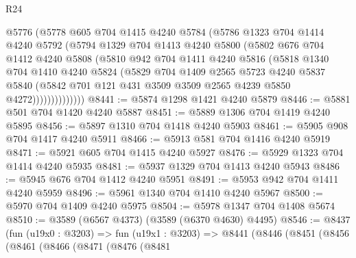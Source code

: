 \begin{lexlean}{R24}
\begin{coremodule}
                @5776
                (@5778
                  @605
                  @704
                  @1415
                  @4240
                  @5784
                  (@5786
                    @1323
                    @704
                    @1414
                    @4240
                    @5792
                    (@5794
                      @1329
                      @704
                      @1413
                      @4240
                      @5800
                      (@5802
                        @676
                        @704
                        @1412
                        @4240
                        @5808
                        (@5810
                          @942
                          @704
                          @1411
                          @4240
                          @5816
                          (@5818
                            @1340
                            @704
                            @1410
                            @4240
                            @5824
                            (@5829
                              @704
                              @1409
                              @2565
                              @5723
                              @4240
                              @5837
                              @5840
                              (@5842
                                @701
                                @121
                                @431
                                @3509
                                @3509
                                @2565
                                @4239
                                @5850
                                @4272))))))))))))))
@8441 := @5874 @1298 @1421 @4240 @5879
@8446 := @5881 @501 @704 @1420 @4240 @5887
@8451 := @5889 @1306 @704 @1419 @4240 @5895
@8456 := @5897 @1310 @704 @1418 @4240 @5903
@8461 := @5905 @908 @704 @1417 @4240 @5911
@8466 := @5913 @581 @704 @1416 @4240 @5919
@8471 := @5921 @605 @704 @1415 @4240 @5927
@8476 := @5929 @1323 @704 @1414 @4240 @5935
@8481 := @5937 @1329 @704 @1413 @4240 @5943
@8486 := @5945 @676 @704 @1412 @4240 @5951
@8491 := @5953 @942 @704 @1411 @4240 @5959
@8496 := @5961 @1340 @704 @1410 @4240 @5967
@8500 := @5970 @704 @1409 @4240 @5975
@8504 := @5978 @1347 @704 @1408 @5674
@8510 := @3589 (@6567 @4373) (@3589 (@6370 @4630) @4495)
@8546 := @8437
    (fun (u19x0 : @3203) =>
    fun (u19x1 : @3203) =>
    @8441
      (@8446
        (@8451
          (@8456
            (@8461
              (@8466
                (@8471
                  (@8476
                    (@8481

\end{coremodule}
\end{lexlean}
